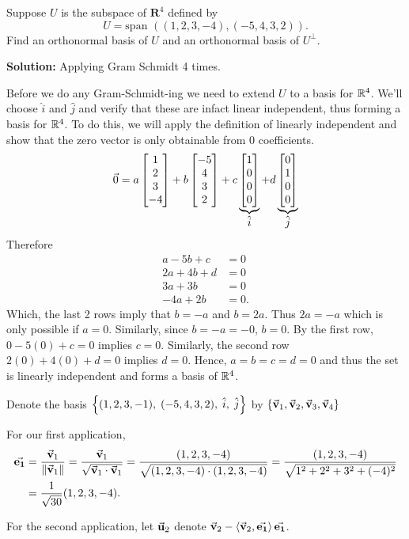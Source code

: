 Suppose $U$ is the subspace of $\mathbf{R}^4$ defined by
    \[
        U = \text{span }((1,2,3,-4), (-5,4,3,2)).
    \]
    Find an orthonormal basis of $U$ and an orthonormal basis of $U^\perp$.
    
    \nnl \textbf{Solution: } Applying Gram Schmidt 4 times. 
    
    \nl Before we do any Gram-Schmidt-ing we need to extend $U$ to a basis for $\mathbb{R}^4$. We'll choose $\hat{i}$ and $\hat{j}$ and verify that these are infact linear independent, thus forming a basis for $\mathbb{R}^4$. To do this, we will apply the definition of linearly independent and show that the zero vector is only obtainable from 0 coefficients.
    $$\vec{0} = a \begin{bmatrix}{1}\\{2}\\{3}\\{-4}\end{bmatrix} + b \begin{bmatrix}{-5}\\{4}\\{3}\\{2}\end{bmatrix} + c \underbrace{\begin{bmatrix}{1}\\{0}\\{0}\\{0}\end{bmatrix}}_{\textstyle \hat{i}} + d \underbrace{\begin{bmatrix}{0}\\{1}\\{0}\\{0}\end{bmatrix}}_{\textstyle \hat{j}}$$
    Therefore
    \begin{align*}
        a - 5b + c &= 0\\
        2a + 4b + d &= 0\\
        3a + 3b &= 0\\
        -4a + 2b &= 0.
    \end{align*}
    Which, the last 2 rows imply that $b = -a$ and $b = 2a$. Thus $2a = -a$ which is only possible if $a=0$. Similarly, since $b=-a=-0$, $b=0$. By the first row, $0 - 5(0) + c = 0$ implies $c=0$. Similarly, the second row $2(0) + 4(0) + d = 0$ implies $d=0$. Hence, $a = b = c = d = 0$ and thus the set is linearly independent and forms a basis of $\mathbb{R}^4$.

    \nl Denote the basis $\left\{{(1,2,3,-1),\;(-5,4,3,2),\;\hat{i},\;\hat{j} }\right\}$ by $\left\{{\vec{\mathbf{v}}_1,\vec{\mathbf{v}}_2,\vec{\mathbf{v}}_3,\vec{\mathbf{v}}_4}\right\}$

    \nnl For our first application,
    \begin{align*}
        \vec{\mathbf{e_{1}}} &= \dfrac{\vec{\mathbf{v}}_1}{\left\| {\vec{\mathbf{v}}_1} \right\|} = \dfrac{\vec{\mathbf{v}}_1}{\sqrt{ \vec{\mathbf{v}}_1 \cdot \vec{\mathbf{v}}_1}} = \dfrac{(1,2,3,-4)}{\sqrt{(1,2,3,-4)\cdot (1,2,3,-4)}} = \dfrac{(1,2,3,-4)}{\sqrt{1^2+2^2+3^2+(-4)^2}} \\&= \frac{1}{{\sqrt{30}}}(1,2,3,-4).
    \end{align*}

    \nl For the second application, let $\vec{\mathbf{u}}_2$ denote $\vec{\mathbf{v}}_2 - \left\langle{\vec{\mathbf{v}}_2, \vec{\mathbf{e_{1}}}}\right\rangle \vec{\mathbf{e_{1}}}$.

